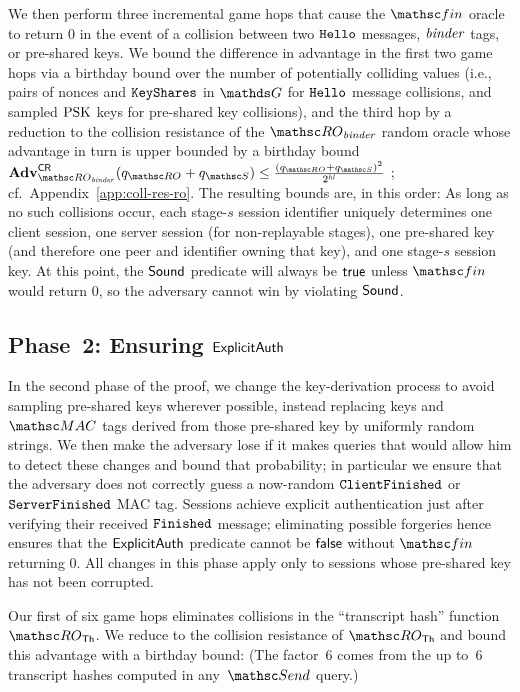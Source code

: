 We then perform three incremental game hops that cause the $\Finalize$ oracle to return $0$ in the event of a collision between two $\mathtt{Hello}$ messages, $\mathit{binder}$ tags, or pre-shared keys.
We bound the difference in advantage in the first two game hops via a birthday bound over the number of potentially colliding values (i.e., pairs of nonces and $\mathtt{KeyShares}$ in $\G$ for $\mathtt{Hello}$ message collisions, and sampled $\mathrm{PSK}$ keys for pre-shared key collisions),
and the third hop by a reduction to the collision resistance of the $\RObinder$ random oracle whose advantage in turn is upper bounded by a birthday bound~$\genAdv{\CollRes}{\RObinder}{\qRO + \qSend} \leq \frac{(\qRO + \qSend)^2}{2^\hashlen}$%
	; cf.\ Appendix~\ref{app:coll-res-ro}.
The resulting bounds are, in this order:
As long as no such collisions occur, each stage-$s$ session identifier uniquely determines one client session, one server session (for non-replayable stages), one pre-shared key (and therefore one peer and identifier owning that key), and one stage-$s$ session key.
At this point, the $\mathsf{Sound}$ predicate will always be $\mathsf{true}$ unless $\Finalize$ would return $0$, so the adversary cannot win by violating $\mathsf{Sound}$.

\subsection*{Phase~2: Ensuring $\mathsf{ExplicitAuth}$}
In the second phase of the proof, we change the key-derivation process to avoid sampling pre-shared keys wherever possible,
instead replacing keys and $\MAC$ tags derived from those pre-shared key by uniformly random strings.
We then make the adversary lose if it makes queries that would allow him to detect these changes and bound that probability;
in particular we ensure that the adversary does not correctly guess a now-random $\mathtt{ClientFinished}$ or $\mathtt{ServerFinished}$ MAC tag.
Sessions achieve explicit authentication just after verifying their received $\mathtt{Finished}$ message;
eliminating possible forgeries hence ensures that the $\mathsf{ExplicitAuth}$ predicate cannot be $\mathsf{false}$ without $\Finalize$ returning $0$.
All changes in this phase apply only to sessions whose pre-shared key has not been corrupted.

Our first of six game hops eliminates collisions in the ``transcript hash'' function $\ROthash$.
We reduce to the collision resistance of $\ROthash$ and bound this advantage with a birthday bound:
(The factor~$6$ comes from the up to~$6$ transcript hashes computed in any~$\Send$ query.)

